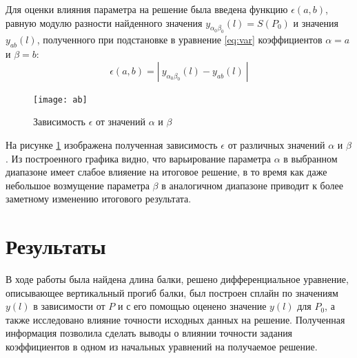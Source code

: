 Для оценки влияния параметра на решение была введена функцию $\epsilon(a, b)$, равную модулю разности найденного значения $y_{\alpha_0\beta_0}(l) = S(P_0)$ и значения $y_{ab}(l)$, полученного при подстановке в уравнение \ref{eq:var} коэффициентов $\alpha = a$ и $\beta = b$:
\begin{equation}
	\epsilon(a, b) = |\ y_{\alpha_0\beta_0}(l) - y_{ab}(l)\ |
\end{equation}

\begin{figure}[H]
\begin{center}
	\vspace{-1cm}
	\texttt{[image: ab]}
	\caption{Зависимость $\epsilon$ от значений $\alpha$ и $\beta$}
	\label{plt:ab}
	\vspace{-0.5cm}
\end{center}
\end{figure}

На рисунке \ref{plt:ab} изображена полученная зависимость $\epsilon$ от различных значений $\alpha$ и $\beta$. Из построенного графика видно, что варьирование параметра  $\alpha$  в выбранном диапазоне имеет слабое влияение на итоговое решение, в то время как даже небольшое возмущение параметра  $\beta$  в аналогичном диапазоне приводит к более заметному изменению итогового результата.

\section{Результаты}

В ходе работы была найдена длина балки, решено дифференциальное уравнение, описывающее вертикальный прогиб балки, был построен сплайн по значениям $y(l)$ в зависимости от $P$ и с его помощью оценено значение $y(l)$ для $P_0$, а также исследовано влияние точности исходных данных на решение. Полученная информация позволила сделать выводы о влиянии точности задания коэффициентов в одном из начальных уравнений на получаемое решение.

